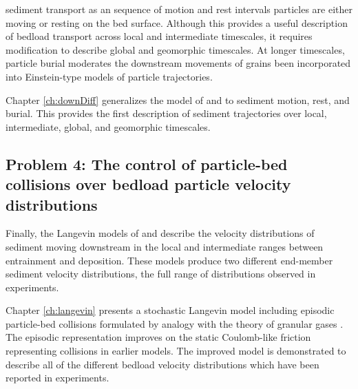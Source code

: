 \DIFdelbegin {}\DIFdelend \DIFaddbegin {}\DIFaddend sediment transport as an \DIFdelbegin {}\DIFdelend \DIFaddbegin {}\DIFaddend sequence of motion and rest intervals \DIFdelbegin {}\DIFdelend \DIFaddbegin {}\DIFaddend particles are either moving or resting on the bed surface. Although this provides a useful description of bedload transport across local and intermediate timescales, it requires modification to describe \DIFdelbegin {}\DIFdelend \DIFaddbegin {}\DIFaddend global and geomorphic timescales. 
At longer timescales, particle burial moderates the downstream movements of grains \DIFdelbegin {}\DIFdelend \DIFaddbegin {}\DIFaddend been incorporated into Einstein-type models of particle trajectories. 

Chapter \ref{ch:downDiff} generalizes the model of \citet{Lisle1998} and \citet{Lajeunesse2017} to \DIFdelbegin {}\DIFdelend \DIFaddbegin {}\DIFaddend sediment motion, rest, and burial.
This provides the first description of sediment trajectories over local, intermediate, global, and geomorphic timescales.

\subsection{Problem 4: The control of particle-bed collisions over bedload particle velocity distributions}

Finally, the Langevin models of \citet{Fan2014} and \citet{Ancey2014} describe the velocity distributions of sediment moving downstream in the local and intermediate ranges between entrainment and deposition.
These models produce two different end-member sediment velocity distributions, \DIFdelbegin {}\DIFdelend \DIFaddbegin {}\DIFaddend the full range of distributions observed in experiments.

Chapter \ref{ch:langevin} presents a stochastic Langevin model including episodic particle-bed collisions formulated by analogy with the theory of granular gases \citep{Brilliantov2004}.
The episodic representation improves on the static Coulomb-like friction representing collisions in earlier models.
The improved model is demonstrated to describe all of the different bedload velocity distributions which have been reported in experiments.



